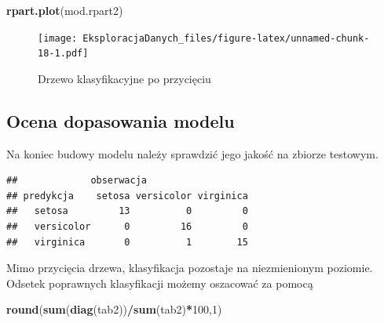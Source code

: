 \documentclass[]{book}
\newenvironment{Shaded}{\begin{snugshade}}{\end{snugshade}}
\newcommand{\DataTypeTok}[1]{\textcolor[rgb]{0.13,0.29,0.53}{#1}}
\newcommand{\DecValTok}[1]{\textcolor[rgb]{0.00,0.00,0.81}{#1}}
\newcommand{\KeywordTok}[1]{\textcolor[rgb]{0.13,0.29,0.53}{\textbf{#1}}}
\newcommand{\NormalTok}[1]{#1}
\newcommand{\OperatorTok}[1]{\textcolor[rgb]{0.81,0.36,0.00}{\textbf{#1}}}
\newcommand{\StringTok}[1]{\textcolor[rgb]{0.31,0.60,0.02}{#1}}
\theoremstyle{plain}
\theoremstyle{definition}
\begin{document}
\begin{Shaded}
\begin{Highlighting}[]
\KeywordTok{rpart.plot}\NormalTok{(mod.rpart2)}
\end{Highlighting}
\end{Shaded}

\begin{figure}
\centering
\texttt{[image: EksploracjaDanych\_files/figure-latex/unnamed-chunk-18-1.pdf]}
\caption{\label{fig:unnamed-chunk-18}Drzewo klasyfikacyjne po przycięciu}
\end{figure}

\hypertarget{ocena-dopasowania-modelu}{%
\subsection{Ocena dopasowania modelu}\label{ocena-dopasowania-modelu}}

Na koniec budowy modelu należy sprawdzić jego jakość na zbiorze testowym.

\begin{Shaded}
\end{Shaded}

\begin{verbatim}
##             obserwacja
## predykcja    setosa versicolor virginica
##   setosa         13          0         0
##   versicolor      0         16         0
##   virginica       0          1        15
\end{verbatim}

Mimo przycięcia drzewa, klasyfikacja pozostaje na niezmienionym poziomie. Odsetek poprawnych klasyfikacji możemy oszacować za pomocą

\begin{Shaded}
\begin{Highlighting}[]
\KeywordTok{round}\NormalTok{(}\KeywordTok{sum}\NormalTok{(}\KeywordTok{diag}\NormalTok{(tab2))}\OperatorTok{/}\KeywordTok{sum}\NormalTok{(tab2)}\OperatorTok{*}\DecValTok{100}\NormalTok{,}\DecValTok{1}\NormalTok{)}
\end{Highlighting}
\end{Shaded}
\end{document}
